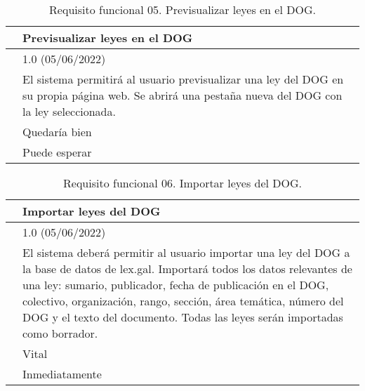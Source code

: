 \begin{table}[H]
\begin{center}
\begin{tabular}{|p{3cm}|p{10cm}|} \hline
\centering {\bf FRQ-05} & Previsualizar leyes en el DOG  \\ \hline\hline
\centering {\bf Versión} & 1.0 (05/06/2022) \\ \hline
\centering {\bf Descripción} & El sistema permitirá al usuario previsualizar una ley del DOG en su propia página web. Se abrirá una pestaña nueva del DOG con la ley seleccionada. \\ \hline
\centering {\bf Importancia} & Quedaría bien \\ \hline
\centering {\bf Urgencia} & Puede esperar \\ \hline
\end{tabular}
\caption{Requisito funcional 05. Previsualizar leyes en el DOG.}
\label{enlaceFRQ5}
\end{center}
\end{table}

\begin{table}[H]
\begin{center}
\begin{tabular}{|p{3cm}|p{10cm}|} \hline
\centering {\bf FRQ-06} & Importar leyes del DOG  \\ \hline\hline
\centering {\bf Versión} & 1.0 (05/06/2022) \\ \hline
\centering {\bf Descripción} & El sistema deberá permitir al usuario importar una ley del DOG a la base de datos de lex.gal. Importará todos los datos relevantes de una ley: sumario, publicador, fecha de publicación en el DOG, colectivo, organización, rango, sección, área temática, número del DOG y el texto del documento. Todas las leyes serán importadas como borrador. \\ \hline
\centering {\bf Importancia} & Vital \\ \hline
\centering {\bf Urgencia} & Inmediatamente \\ \hline
\end{tabular}
\caption{Requisito funcional 06. Importar leyes del DOG.}
\label{enlaceFRQ6}
\end{center}
\end{table}

